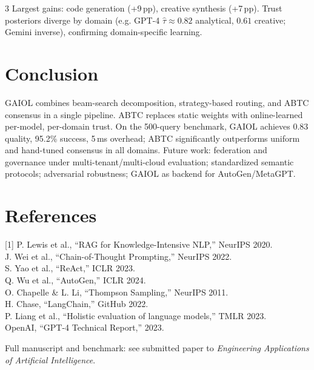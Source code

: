 \documentclass[14pt]{article}
\begin{document}
\begin{multicols}{3}
Largest gains: code generation (+9\,pp), creative synthesis (+7\,pp). Trust posteriors diverge by domain (e.g. GPT-4 $\hat{\tau}\approx 0.82$ analytical, $0.61$ creative; Gemini inverse), confirming domain-specific learning.

\section*{Conclusion}
GAIOL combines beam-search decomposition, strategy-based routing, and ABTC consensus in a single pipeline. ABTC replaces static weights with online-learned per-model, per-domain trust. On the 500-query benchmark, GAIOL achieves 0.83 quality, 95.2\% success, 5\,ms overhead; ABTC significantly outperforms uniform and hand-tuned consensus in all domains. Future work: federation and governance under multi-tenant/multi-cloud evaluation; standardized semantic protocols; adversarial robustness; GAIOL as backend for AutoGen/MetaGPT.

\section*{References}
\small
[1] P. Lewis et al., ``RAG for Knowledge-Intensive NLP,'' NeurIPS 2020.\\
[2] J. Wei et al., ``Chain-of-Thought Prompting,'' NeurIPS 2022.\\
[3] S. Yao et al., ``ReAct,'' ICLR 2023.\\
[4] Q. Wu et al., ``AutoGen,'' ICLR 2024.\\
[5] O. Chapelle \& L. Li, ``Thompson Sampling,'' NeurIPS 2011.\\
[6] H. Chase, ``LangChain,'' GitHub 2022.\\
[7] P. Liang et al., ``Holistic evaluation of language models,'' TMLR 2023.\\
[8] OpenAI, ``GPT-4 Technical Report,'' 2023.

\end{multicols}

\vspace{0.3cm}
\begin{center}
{\small Full manuscript and benchmark: see submitted paper to \textit{Engineering Applications of Artificial Intelligence}.}
\end{center}
\end{document}
